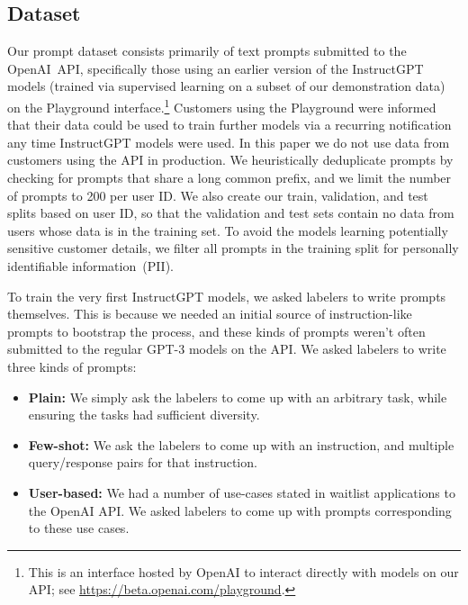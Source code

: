 \documentclass{article}
\begin{document}
\begin{table}
{\begin{tabular}{p{} p{}}
 \bottomrule
 \end{tabular}
}
\end{table}

\subsection{Dataset}
\label{sec:dataset}

Our prompt dataset consists primarily of text prompts submitted to the OpenAI~API, specifically those using an earlier version of the InstructGPT models (trained via supervised learning on a subset of our demonstration data) on the Playground interface.\footnote{This is an interface hosted by OpenAI to interact directly with models on our API; see \url{https://beta.openai.com/playground}.} 
Customers using the Playground were informed that their data could be used to train further models via a recurring notification any time InstructGPT models were used.
In this paper we do not use data from customers using the API in production. We heuristically deduplicate prompts by checking for prompts that share a long common prefix, and we limit the number of prompts to 200 per user ID.  We also create our train, validation, and test splits based on user ID, so that the validation and test sets contain no data from users whose data is in the training set.  To avoid the models learning potentially sensitive customer details, we filter all prompts in the training split for personally identifiable information~(PII).

To train the very first InstructGPT models, we asked labelers to write prompts themselves. This is because we needed an initial source of instruction-like prompts to bootstrap the process, and these kinds of prompts weren't often submitted to the regular GPT-3 models on the API. We asked labelers to write three kinds of prompts:
\begin{itemize}
    \item \textbf{Plain:}  We simply ask the labelers to come up with an arbitrary task, while ensuring the tasks had sufficient diversity.
\item \textbf{Few-shot:}  We ask the labelers to come up with an instruction, and multiple query/response pairs for that instruction.  
\item \textbf{User-based:}  We had a number of use-cases stated in waitlist applications to the OpenAI API.  We asked labelers to come up with prompts corresponding to these use cases. 
\end{itemize}
\end{document}
